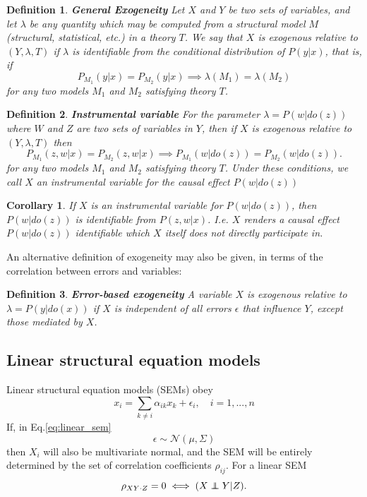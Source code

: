 \documentclass[11pt]{article}
\numberwithin{equation}{section}
\newcommand\indep{\protect\mathpalette{\protect\independenT}{\perp}}
\def\independenT#1#2{\mathrel{\rlap{$#1#2$}\mkern2mu{#1#2}}}
\newtheorem{defn}{Definition}[section]
\newtheorem{cor}{Corollary}[section]
\begin{document}
\begin{defn}
\textbf{General Exogeneity} Let $X$ and $Y$ be two sets of variables, and let $\lambda$ be any quantity which may be computed from a structural model $M$ (structural, statistical, etc.) in a theory $T$. We say that $X$ is exogenous relative to $(Y, \lambda ,T)$ if $\lambda$ is identifiable from the conditional distribution of $P(y|x)$, that is, if
\begin{equation}
P_{M_1}(y|x) = P_{M_2}(y|x) \implies \lambda(M_1) = \lambda(M_2)
\end{equation}
for any two models $M_1$ and $M_2$ satisfying theory $T$. 
\end{defn}

\begin{defn}
\textbf{Instrumental variable} For the parameter $\lambda = P(w|do(z))$ where $W$ and $Z$ are two sets of variables in $Y$, then if $X$ is exogenous relative to $(Y, \lambda, T)$ then
\begin{equation}
P_{M_1}(z,w|x) = P_{M_2}(z,w|x) \implies P_{M_1}(w|do(z)) = P_{M_2}(w|do(z)).
\end{equation}
for any two models $M_1$ and $M_2$ satisfying theory $T$. Under these conditions, we call $X$ an instrumental variable for the causal effect $P(w|do(z))$
\end{defn}

\begin{cor}
If $X$ is an instrumental variable for $P(w|do(z))$, then $P(w|do(z))$ is identifiable from $P(z,w|x)$. I.e. $X$ renders a causal effect $P(w|do(z))$ identifiable which $X$ itself does not directly participate in.
\end{cor}

An alternative definition of exogeneity may also be given, in terms of the correlation between errors and variables:
\begin{defn}
\textbf{Error-based exogeneity} A variable $X$ is exogenous relative to $\lambda=P(y|do(x))$ if $X$ is independent of all errors $\epsilon$ that influence $Y$, except those mediated by $X$. 
\end{defn}

\subsection{Linear structural equation models}

Linear structural equation models (SEMs) obey
\begin{equation}
x_i = \sum_{k \neq i} \alpha_{ik} x_k + \epsilon_i, \quad i=1,...,n  \label{eq:linear_sem}
\end{equation}
If, in Eq.\eqref{eq:linear_sem} 
\begin{equation}
\epsilon \sim \mathcal{N}(\mu, \Sigma)
\end{equation}
then $X_i$ will also be multivariate normal, and the SEM will be entirely determined by the set of correlation coefficients $\rho_{ij}$. For a linear SEM
\begin{equation}
\rho_{XY\cdot Z} = 0 \iff (X \indep Y | Z).
\end{equation}
\end{document}
